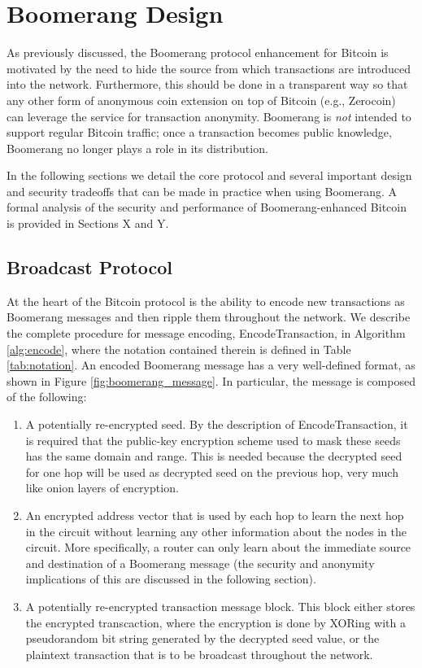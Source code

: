\section{Boomerang Design} \label{sec:design}

As previously discussed, the Boomerang protocol enhancement for Bitcoin is motivated by the need to hide the source from which transactions are introduced into the network. Furthermore, this should be done in a transparent way so that any other form of anonymous coin extension on top of Bitcoin (e.g., Zerocoin) can leverage the service for transaction anonymity. Boomerang is \emph{not} intended to support regular Bitcoin traffic; once a transaction becomes public knowledge, Boomerang no longer plays a role in its distribution. 

In the following sections we detail the core protocol and several important design and security tradeoffs that can be made in practice when using Boomerang. A formal analysis of the security and performance of Boomerang-enhanced Bitcoin is provided in Sections X and Y. 

\subsection{Broadcast Protocol}

At the heart of the Bitcoin protocol is the ability to encode new transactions as Boomerang messages and then ripple them throughout the network. We describe the complete procedure for message encoding, {\sf EncodeTransaction}, in Algorithm \ref{alg:encode}, where the notation contained therein is defined in Table \ref{tab:notation}. An encoded Boomerang message has a very well-defined format, as shown in Figure \ref{fig:boomerang_message}. In particular, the message is composed of the following:
\begin{enumerate}
	\item A potentially re-encrypted seed. By the description of {\sf EncodeTransaction}, it is required that the public-key encryption scheme used to mask these seeds has the same domain and range. This is needed because the decrypted seed for one hop will be used as decrypted seed on the previous hop, very much like onion layers of encryption.
	\item An encrypted address vector that is used by each hop to learn the next hop in the circuit without learning any other information about the nodes in the circuit. More specifically, a router can only learn about the immediate source and destination of a Boomerang message (the security and anonymity implications of this are discussed in the following section).
	\item A potentially re-encrypted transaction message block. This block either stores the encrypted transcaction, where the encryption is done by XORing with a pseudorandom bit string generated by the decrypted seed value, or the plaintext transaction that is to be broadcast throughout the network.
\end{enumerate}

